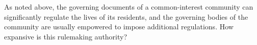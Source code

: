 As noted above, the governing documents of a common-interest community can
significantly regulate the lives of its residents, and the governing bodies of
the community are usually empowered to impose additional regulations. How
expansive is this rulemaking authority?

